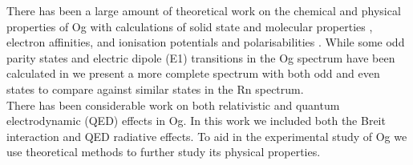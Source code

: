 \documentclass[8pt,a4paper, twoside]{report}
\begin{document}
 There has been a large amount of  theoretical work on the chemical and physical properties of Og with calculations of solid state and molecular properties \cite{Kullie2012, Shee2015, Nash1999, Nash2005, Peter2016}, electron affinities\cite{Pitzer1975, EliavOg1996, PershinaOg2008, Hangele2012, Goidenko2003}, and ionisation potentials and polarisabilities \cite{PershinaOg2008, Desclaux1973, Nash2005, Jerabek2018}. While some odd parity states and electric dipole (E1) transitions in the Og spectrum have been calculated in \cite{Indelicato2007} we present a more complete spectrum with both odd and even states to compare against similar states in the Rn spectrum. \\
There has been considerable work on both relativistic and quantum electrodynamic (QED) effects \cite{Pyykko1988, Jerabek2018, Goidenko2003, Eliav2015, Indelicato2007, Thierfelder2010} in Og. In this work we included both the Breit interaction and QED radiative effects. To aid in the experimental study of Og we use  theoretical methods to further study its physical properties. 
\end{document}
